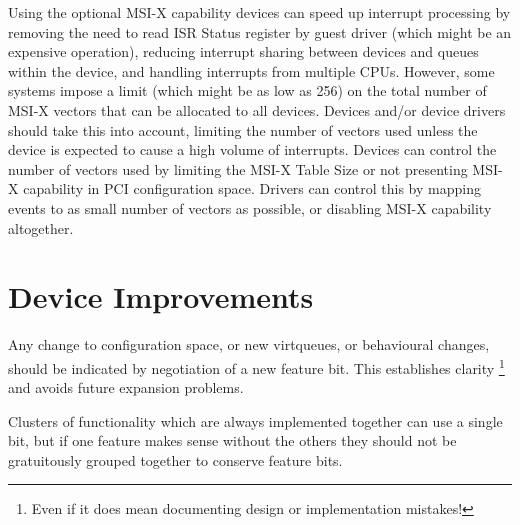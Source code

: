 Using the optional MSI-X capability devices can speed up
interrupt processing by removing the need to read ISR Status
register by guest driver (which might be an expensive operation),
reducing interrupt sharing between devices and queues within the
device, and handling interrupts from multiple CPUs. However, some
systems impose a limit (which might be as low as 256) on the
total number of MSI-X vectors that can be allocated to all
devices. Devices and/or device drivers should take this into
account, limiting the number of vectors used unless the device is
expected to cause a high volume of interrupts. Devices can
control the number of vectors used by limiting the MSI-X Table
Size or not presenting MSI-X capability in PCI configuration
space. Drivers can control this by mapping events to as small
number of vectors as possible, or disabling MSI-X capability
altogether.

\section{Device Improvements}\label{sec:Creating New Device Types / Device Improvements}

Any change to configuration space, or new virtqueues, or
behavioural changes, should be indicated by negotiation of a new
feature bit. This establishes clarity
\footnote{Even if it does mean documenting design or implementation
mistakes!
} and avoids future expansion problems.

Clusters of functionality which are always implemented together
can use a single bit, but if one feature makes sense without the
others they should not be gratuitously grouped together to
conserve feature bits.


